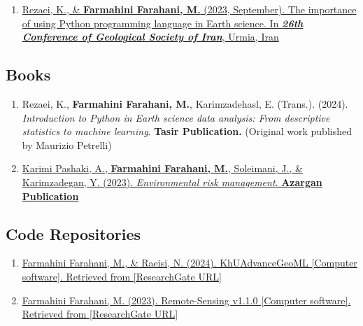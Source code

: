 \documentclass[letterpaper,11pt]{article}
\begin{document}
\begin{enumerate}[label=\arabic*.,left=0pt,topsep=7.5pt,partopsep=0pt,itemsep=3.5pt,parsep=0pt]
		\item \href{https://www.researchgate.net/publication/374914382_The_importance_of_using_Python_programming_language_in_Earth_science?_sg%5B0%5D=LoPp16VH0-6l0fXCdjovY4qsKuuoBEjgL0erfoZR4Uu8OgKpJLTjo-i0ER6DJQvtxV5yn-6F_LjppW5y3_P8-rhUY1Iw0vsVNspav0fh.6VV6-YV9qqXIscybiYu4WPY6XDq3G_GtZ2_dwcU75rr-MDSamPnew9PxJPwXeni5MqqF4VPfzeTeaEakSNpS3g&_tp=eyJjb250ZXh0Ijp7ImZpcnN0UGFnZSI6ImhvbWUiLCJwYWdlIjoicHJvZmlsZSIsInByZXZpb3VzUGFnZSI6InByb2ZpbGUiLCJwb3NpdGlvbiI6InBhZ2VDb250ZW50In19}{Rezaei, K., \& \textbf{Farmahini Farahani, M.} (2023, September). The importance of using Python programming language in Earth science. In \textit{\textbf{26th Conference of Geological Society of Iran}}, Urmia, Iran}
	\end{enumerate}
	
	\subsection*{Books}
	\begin{enumerate}[label=\arabic*.,left=0pt,topsep=7.5pt,partopsep=0pt,itemsep=3.5pt,parsep=0pt]
		\item {Rezaei, K., \textbf{Farmahini Farahani, M.}, Karimzadehasl, E. (Trans.). (2024). \textit{Introduction to Python in Earth science data analysis: From descriptive statistics to machine learning}. \textbf{Tasir Publication.} (Original work published by Maurizio Petrelli)} 
		\item \href{https://www.researchgate.net/publication/374919527_Environmental_Risk_Management?_sg%5B0%5D=LoPp16VH0-6l0fXCdjovY4qsKuuoBEjgL0erfoZR4Uu8OgKpJLTjo-i0ER6DJQvtxV5yn-6F_LjppW5y3_P8-rhUY1Iw0vsVNspav0fh.6VV6-YV9qqXIscybiYu4WPY6XDq3G_GtZ2_dwcU75rr-MDSamPnew9PxJPwXeni5MqqF4VPfzeTeaEakSNpS3g&_tp=eyJjb250ZXh0Ijp7ImZpcnN0UGFnZSI6ImhvbWUiLCJwYWdlIjoicHJvZmlsZSIsInByZXZpb3VzUGFnZSI6InByb2ZpbGUiLCJwb3NpdGlvbiI6InBhZ2VDb250ZW50In19}{Karimi Pashaki, A., \textbf{Farmahini Farahani, M.}, Soleimani, J., \& Karimzadegan, Y. (2023). \textit{Environmental risk management}. \textbf{Azargan Publication}} 
	\end{enumerate}
	
	\subsection*{Code Repositories}
	\begin{enumerate}[label=\arabic*.,left=0pt,topsep=7.5pt,partopsep=0pt,itemsep=3.5pt,parsep=0pt]
		\item \href{https://www.researchgate.net/publication/[placeholder]}{Farmahini Farahani, M., \& Raeisi, N. (2024). KhUAdvanceGeoML [Computer software]. Retrieved from [ResearchGate URL]} 
		\item \href{https://www.researchgate.net/publication/[placeholder]}{Farmahini Farahani, M. (2023). Remote-Sensing v1.1.0 [Computer software]. Retrieved from [ResearchGate URL]} 
	\end{enumerate}
\end{document}
